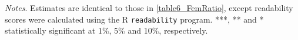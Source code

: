 \begin{sidewaystable}
\begin{threeparttable}
\begin{tabular}{p{3cm}S@{}S@{}S@{}S@{}S@{}S@{}S@{}S@{}S@{}S@{}S@{}}
            \bottomrule
        \end{tabular}
        \begin{tablenotes}
            \tiny
            \item \textit{Notes}. Estimates are identical to those in \autoref{table6_FemRatio}, except readability scores were calculated using the R \texttt{readability} program. ***, ** and * statistically significant at 1\%, 5\% and 10\%, respectively.
        \end{tablenotes}
    \end{threeparttable}

\end{sidewaystable}
